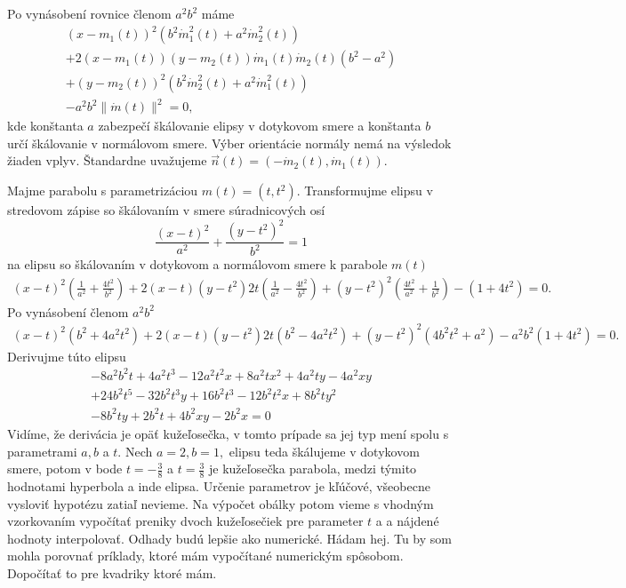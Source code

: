 Po vynásobení rovnice členom $a^2b^2$ máme
\begin{align*}
(x-m_1(t))^2(b^2 \dot{m}_1^2(t) + a^2 \dot{m}_2^2(t)) \\
+ 2(x-m_1(t))(y-m_2(t))\dot{m}_1(t)\dot{m}_2(t)(b^2-a^2) \\
+ (y-m_2(t))^2 (b^2 \dot{m}_2^2(t) + a^2 \dot{m}_1^2(t))  \\
- a^2 b^2\| \dot{m}(t) \|^2 = 0,
\end{align*}
kde konštanta $a$ zabezpečí škálovanie elipsy v dotykovom smere a konštanta $b$ určí škálovanie v normálovom smere. Výber orientácie normály nemá na výsledok žiaden vplyv. Štandardne uvažujeme $\vec{n}(t)=(-\dot{m}_2(t), \dot{m}_1(t)).$
\begin{example}[Parabola]
Majme parabolu s parametrizáciou $m(t)=(t, t^2).$ Transformujme elipsu v stredovom zápise so škálovaním v smere súradnicových osí
\begin{equation}
\frac{(x - t)^2}{{a^2}} + \frac{(y - t^2)^2}{b^2} = 1
\end{equation}
na elipsu so škálovaním v dotykovom a normálovom smere k parabole $m(t)$
\begin{align*}
(x-t)^2(\frac{1}{a^2} + \frac{4t^2}{b^2}) + 2(x-t)(y-t^2)2t(\frac{1}{a^2}-\frac{4t^2}{b^2})+(y-t^2)^2(\frac{4t^2}{a^2} + \frac{1}{b^2}) - (1+4t^2) = 0.
\end{align*}
Po vynásobení členom $a^2b^2$
\begin{align*}
(x-t)^2(b^2 + 4a^2t^2) + 2(x-t)(y-t^2)2t(b^2-4a^2t^2)+(y-t^2)^2(4b^2t^2 + a^2) - a^2b^2(1+4t^2) = 0.
\end{align*}
Derivujme túto elipsu 
\begin{align*}
-8a^{2}b^{2}t+4a^{2}t^{3}-12a^{2}t^{2}x+8a^{2}tx^{2}+4a^{2}ty-4a^{2}xy \\ +24b^{2}t^{5}-32b^{2}t^{3}y+16b^{2}t^{3}-12b^{2}t^{2}x+8b^{2} ty^{2} \\-8b^{2}ty+2b^{2}t+4b^{2}xy-2b^{2}x=0
\end{align*}
Vidíme, že derivácia je opäť kužeľosečka, v tomto prípade sa jej typ mení spolu s parametrami $a, b$ a $t$.
Nech $a = 2, b = 1, $ elipsu teda škálujeme v dotykovom smere, potom v bode $t = - \frac{3}{8}$ a $t = \frac{3}{8}$ je kužeľosečka parabola, medzi týmito hodnotami hyperbola a inde elipsa. Určenie parametrov je kľúčové, všeobecne vysloviť hypotézu zatiaľ nevieme. Na výpočet obálky potom vieme s vhodným vzorkovaním vypočítať preniky dvoch kužeľosečiek pre parameter $t$ a a nájdené hodnoty interpolovať. Odhady budú lepšie ako numerické. Hádam hej. Tu by som mohla porovnať príklady, ktoré mám vypočítané numerickým spôsobom. Dopočítať to pre kvadriky ktoré mám.
\end{example}

